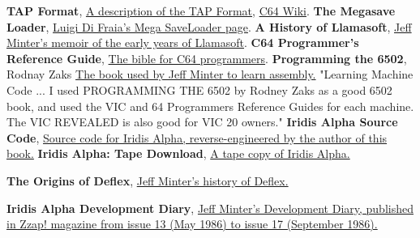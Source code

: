 \renewcommand{\bibname}{Notes \&\ References}
\begin{thebibliography}{999}


  \textbf{TAP Format},
  \href{http://unusedino.de/ec64/technical/formats/tap.html}{A description of the TAP Format},
  \href{https://www.c64-wiki.com/wiki/TAP}{C64 Wiki}.
  \textbf{The Megasave Loader},
  \href{https://www.luigidifraia.com/doku/doku.php?id=commodore:tapes:loaders:mega-save}{Luigi Di Fraia's Mega SaveLoader page}.
  \textbf{A History of Llamasoft},
  \href{http://minotaurproject.co.uk/YakImages/AHistoryofLlamasoft.pdf}{Jeff Minter's memoir of the early years of Llamasoft}.
  \textbf{C64 Programmer's Reference Guide},
  \href{https://archive.org/details/c64-programmer-ref}{The bible for C64 programmers}.
  \textbf{Programming the 6502}, Rodnay Zaks
  \href{https://archive.org/details/Programming_the_6502_OCR}{The book used by Jeff Minter to learn assembly.} "Learning Machine Code ... I used PROGRAMMING THE 6502 by Rodney Zaks as a good 6502 book, and used the VIC and 64 Programmers Reference Guides for each machine. The VIC REVEALED is also good for VIC 20 owners."
  \textbf{Iridis Alpha Source Code},
  \href{https://github.com/mwenge/iridisalpha}{Source code for Iridis Alpha, reverse-engineered by the author of this book.}
  \textbf{Iridis Alpha: Tape Download},
  \href{http://www.llamasoftarchive.org/oldsite/llamasoft/cbm64/IridisAlpha.zip}{A tape copy of Iridis Alpha.}

  \textbf{The Origins of Deflex},
  \href{https://web.archive.org/web/20230811235533/https://stinkygoat.livejournal.com/211183.html}{Jeff Minter's history of Deflex.}

  \textbf{Iridis Alpha Development Diary},
    \href{https://web.archive.org/web/20230322100622/https://codetapper.com/c64/diary-of-a-game/iridis-alpha/}{Jeff Minter's Development Diary, published in Zzap! magazine from issue 13 (May 1986) to issue 17 (September 1986).}

\end{thebibliography}
